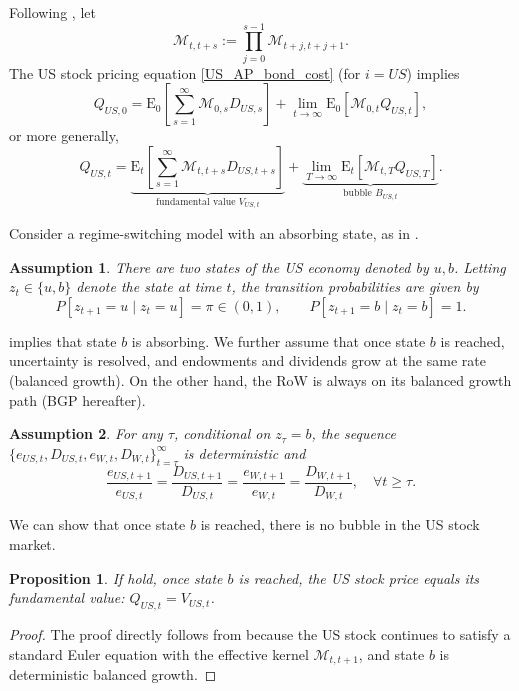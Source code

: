 \documentclass[12pt]{article}
\theoremstyle{plain}
\newtheorem{ass}{Assumption}
\newtheorem{prop}{Proposition}
\begin{document}
Following \citet{hirano2025technological}, let
\[
\mathcal{M}_{t,t+s}:=\prod_{j=0}^{s-1} \mathcal{M}_{t+j,t+j+1}.
\]
The US stock pricing equation \eqref{US_AP_bond_cost} (for $i=US$) implies
\[
Q_{US,0}=
\mathrm{E}_0 \left[\sum_{s=1}^{\infty} \mathcal{M}_{0,s} D_{US,s}\right]
+\lim_{t \rightarrow \infty} \mathrm{E}_0\left[\mathcal{M}_{0,t} Q_{US,t}\right],
\]
or more generally,
\[
Q_{US,t}=
\underbrace{\mathrm{E}_t \left[ \sum_{s=1}^{\infty} \mathcal{M}_{t,t+s} D_{US,t+s}\right]}_{\text{fundamental value }V_{US,t}}
+\underbrace{\lim_{T \rightarrow \infty} \mathrm{E}_t\left[\mathcal{M}_{t,T} Q_{US,T}\right]}_{\text{bubble }B_{US,t}}.
\]

Consider a regime-switching model with an absorbing state, as in \citet{weil1987confidence}.

\begin{ass}\label{ass_regime_switch}
There are two states of the US economy denoted by $u, b$. Letting $z_t \in \{u, b\}$ denote the state at time $t$,
the transition probabilities are given by
\[
P[z_{t+1} = u \mid z_t = u] = \pi \in (0,1), \qquad P[z_{t+1} = b \mid z_t = b] = 1.
\]
\end{ass}

 implies that state $b$ is absorbing. We further assume that once state $b$ is reached, uncertainty is resolved,
and endowments and dividends grow at the same rate (balanced growth). On the other hand, the RoW is always on its balanced growth path (BGP hereafter).

\begin{ass}\label{ass_balanced_growth}
For any $\tau$, conditional on $z_\tau = b$, the sequence
$\{e_{US,t}, D_{US,t}, e_{W,t}, D_{W,t}\}_{t=\tau}^\infty$ is deterministic and
\[
\frac{e_{US,t+1}}{e_{US, t}} =
\frac{D_{US, t+1}}{D_{US,t}}=
\frac{e_{W,t+1}}{e_{W, t}} =
\frac{D_{W, t+1}}{D_{W,t}} ,\quad \forall t \geq \tau.
\]
\end{ass}

We can show that once state $b$ is reached, there is no bubble in the US stock market.

\begin{prop}\label{prop1}
If  hold, once state $b$ is reached, the US stock price equals its fundamental value:
$Q_{US,t}=V_{US,t}$.
\end{prop}

\begin{proof}
The proof directly follows from \citet{hirano2025technological} because the US stock continues to satisfy a standard
Euler equation with the effective kernel $\mathcal M_{t,t+1}$, and state $b$ is deterministic balanced growth.
\end{proof}
\end{document}
